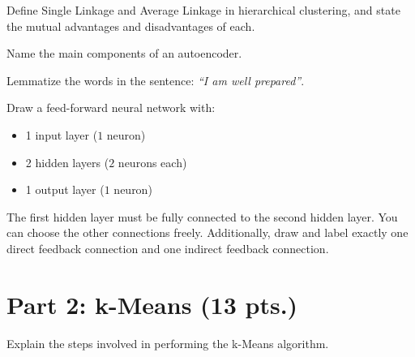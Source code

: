 \documentclass[12pt]{article}
\begin{document}
    \begin{ejercicio}
        Define Single Linkage and Average Linkage in hierarchical clustering, and state the mutual advantages and disadvantages of each.
    \end{ejercicio}

    \begin{ejercicio}[Autoencoders (1 pt.)]
        Name the main components of an autoencoder.
    \end{ejercicio}

    \begin{ejercicio}
        Lemmatize the words in the sentence: \textit{``I am well prepared''}.
    \end{ejercicio}

    \begin{ejercicio}
        Draw a feed-forward neural network with:
        \begin{itemize}
            \item 1 input layer ($1$ neuron)
            \item 2 hidden layers ($2$ neurons each)
            \item 1 output layer ($1$ neuron)
        \end{itemize}
        The first hidden layer must be fully connected to the second hidden layer. You can choose the other connections freely. Additionally, draw and label exactly one direct feedback connection and one indirect feedback connection.
    \end{ejercicio}

    \newpage

    \section*{Part 2: k-Means (13 pts.)}

    \begin{ejercicio}
        Explain the steps involved in performing the k-Means algorithm.
    \end{ejercicio}
\end{document}

